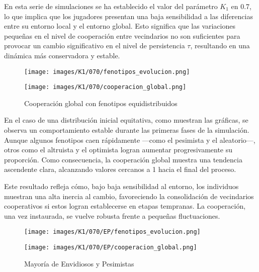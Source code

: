 \documentclass[a4paper,12pt]{report}
\begin{document}
En esta serie de simulaciones se ha establecido el valor del parámetro \( K_1 \) en 0.7, lo que implica que los jugadores presentan una baja sensibilidad a las diferencias entre su entorno local y el entorno global. Esto significa que las variaciones pequeñas en el nivel de cooperación entre vecindarios no son suficientes para provocar un cambio significativo en el nivel de persistencia \( \tau \), resultando en una dinámica más conservadora y estable.

\begin{figure}[h!]
    \centering
    \begin{minipage}{0.49\textwidth}
    \centering
    \texttt{[image: images/K1/070/fenotipos\_evolucion.png]}
    \label{fig:enter-label}
    \end{minipage}
    \hfill
    \begin{minipage}{0.49\textwidth}
    \centering
    \texttt{[image: images/K1/070/cooperacion\_global.png]}
    \label{fig:enter-label}
    \end{minipage}
    \caption{Cooperación global con fenotipos equidistribuidos}
\end{figure}

En el caso de una distribución inicial equitativa, como muestran las gráficas, se observa un comportamiento estable durante las primeras fases de la simulación. Aunque algunos fenotipos caen rápidamente —como el pesimista y el aleatorio—, otros como el altruista y el optimista logran aumentar progresivamente su proporción. Como consecuencia, la cooperación global muestra una tendencia ascendente clara, alcanzando valores cercanos a 1 hacia el final del proceso.

Este resultado refleja cómo, bajo baja sensibilidad al entorno, los individuos muestran una alta inercia al cambio, favoreciendo la consolidación de vecindarios cooperativos si estos logran establecerse en etapas tempranas. La cooperación, una vez instaurada, se vuelve robusta frente a pequeñas fluctuaciones.

\newpage

\begin{figure}[h]
    \centering
    \begin{minipage}{0.49\textwidth}
    \centering
    \texttt{[image: images/K1/070/EP/fenotipos\_evolucion.png]}
    \label{fig:enter-label}
    \end{minipage}
    \hfill
    \begin{minipage}{0.49\textwidth}
    \centering
    \texttt{[image: images/K1/070/EP/cooperacion\_global.png]}
    \label{fig:enter-label}
    \end{minipage}
    \caption{Mayoría de Envidiosos y Pesimistas}
\end{figure}
\end{document}
